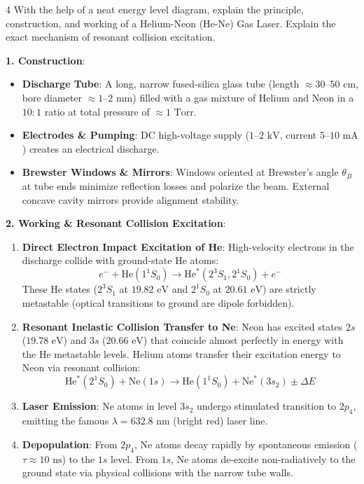 \vspace{4mm}

\begin{theoryq}{4}
With the help of a neat energy level diagram, explain the principle, construction, and working of a Helium-Neon (He-Ne) Gas Laser. Explain the exact mechanism of resonant collision excitation.
\end{theoryq}
\begin{theorysol}
\textbf{1. Construction}:
\begin{itemize}
    \item \textbf{Discharge Tube}: A long, narrow fused-silica glass tube (length $\approx 30\text{--}50\text{ cm}$, bore diameter $\approx 1\text{--}2\text{ mm}$) filled with a gas mixture of Helium and Neon in a $10:1$ ratio at total pressure of $\approx 1\text{ Torr}$.
    \item \textbf{Electrodes \& Pumping}: DC high-voltage supply ($1\text{--}2\text{ kV}$, current $5\text{--}10\text{ mA}$) creates an electrical discharge.
    \item \textbf{Brewster Windows \& Mirrors}: Windows oriented at Brewster's angle $\theta_B$ at tube ends minimize reflection losses and polarize the beam. External concave cavity mirrors provide alignment stability.
\end{itemize}

\textbf{2. Working \& Resonant Collision Excitation}:
\begin{enumerate}
    \item \textbf{Direct Electron Impact Excitation of He}: High-velocity electrons in the discharge collide with ground-state He atoms:
    \begin{equation}
    e^- + \text{He}(1^1S_0) \to \text{He}^*(2^3S_1, 2^1S_0) + e^-
    \end{equation}
    These He states ($2^3S_1$ at $19.82\text{ eV}$ and $2^1S_0$ at $20.61\text{ eV}$) are strictly metastable (optical transitions to ground are dipole forbidden).
    \item \textbf{Resonant Inelastic Collision Transfer to Ne}: Neon has excited states $2s$ ($19.78\text{ eV}$) and $3s$ ($20.66\text{ eV}$) that coincide almost perfectly in energy with the He metastable levels. Helium atoms transfer their excitation energy to Neon via resonant collision:
    \begin{equation}
    \text{He}^*(2^1S_0) + \text{Ne}(1s) \to \text{He}(1^1S_0) + \text{Ne}^*(3s_2) \pm \Delta E
    \end{equation}
    \item \textbf{Laser Emission}: Ne atoms in level $3s_2$ undergo stimulated transition to $2p_4$, emitting the famous \textbf{$\lambda = 632.8\text{ nm}$} (bright red) laser line.
    \item \textbf{Depopulation}:
    From $2p_4$, Ne atoms decay rapidly by spontaneous emission ($\tau \approx 10\text{ ns}$) to the $1s$ level.
    From $1s$, Ne atoms de-excite non-radiatively to the ground state via physical collisions with the narrow tube walls.
\end{enumerate}


\end{theorysol}
